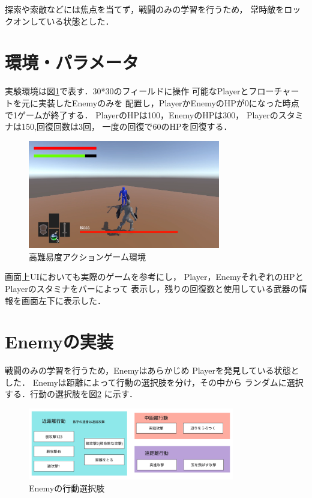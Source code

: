 \documentclass[a4paper,12pt,oneside,openany,titlepage]{jreport}
\begin{document}
 探索や索敵などには焦点を当てず，戦闘のみの学習を行うため，
 常時敵をロックオンしている状態とした．
 
 \section{環境・パラメータ}
 実験環境は図\ref{kankyou}で表す．30*30のフィールドに操作
 可能なPlayerとフローチャートを元に実装したEnemyのみを
 配置し，PlayerかEnemyのHPが0になった時点で1ゲームが終了する．
 PlayerのHPは100，EnemyのHPは300，
 Playerのスタミナは150,回復回数は3回，
 一度の回復で60のHPを回復する．
 
 
 \begin{figure}[h]
   \begin{center}
     \includegraphics[width=8.4cm]{ActionGameImage.png}
     \caption{高難易度アクションゲーム環境}
     \label{kankyou}
   \end{center}
 \end{figure}
 
 画面上UIにおいても実際のゲームを参考にし，
 Player，EnemyそれぞれのHPとPlayerのスタミナをバーによって
 表示し，残りの回復数と使用している武器の情報を画面左下に表示した．
 
 
 
 \section{Enemyの実装}
 戦闘のみの学習を行うため，Enemyはあらかじめ
 Playerを発見している状態とした．
 Enemyは距離によって行動の選択肢を分け，その中から
 ランダムに選択する．行動の選択肢を図\ref{action_choice}
 に示す．
 
 \begin{figure}[h]
   \begin{center}
     \includegraphics[width=9cm]{action_choice.png}
     \caption{Enemyの行動選択肢}
     \label{action_choice}
   \end{center}
 \end{figure}
 
\end{document}
